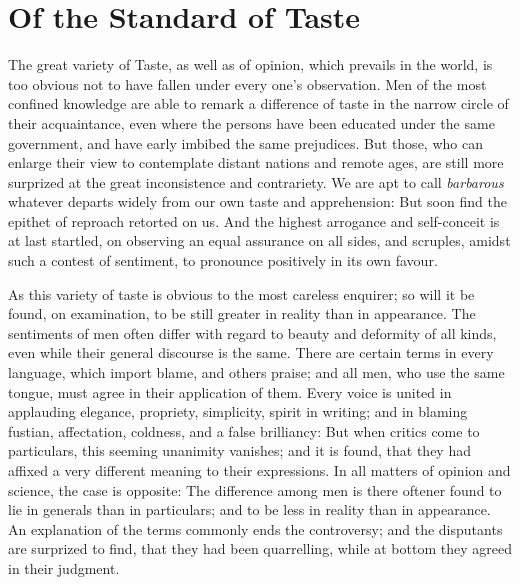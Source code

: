 
\author{David Hume}
\chapter{Of the Standard of Taste\footnotemark}

The great variety of Taste, as well as of opinion, which
prevails in the world, is too obvious not to have fallen under every
one's observation. Men of the most confined knowledge are able to
remark a difference of taste in the narrow circle of their
acquaintance, even where the persons have been educated under the same
government, and have early imbibed the same prejudices. But those, who
can enlarge their view to contemplate distant nations and remote ages,
are still more surprized at the great inconsistence and contrariety.
We are apt to call \textit{barbarous} whatever departs widely from our
own taste and apprehension: But soon find the epithet of reproach
retorted on us. And the highest arrogance and self-conceit is at last
startled, on observing an equal assurance on all sides, and scruples,
amidst such a contest of sentiment, to pronounce positively in its own
favour.

As this variety of taste is obvious to the most careless enquirer; so
will it be found, on examination, to be still greater in reality than
in appearance. The sentiments of men often differ with regard to
beauty and deformity of all kinds, even while their general discourse
is the same. There are certain terms in every language, which import
blame, and others praise; and all men, who use the same tongue, must
agree in their application of them. Every voice is united in
applauding elegance, propriety, simplicity, spirit in writing; and in
blaming fustian, affectation, coldness, and a false brilliancy: But
when critics come to particulars, this seeming unanimity vanishes; and
it is found, that they had affixed a very different meaning to their
expressions. In all matters of opinion and science, the case is
opposite: The difference among men is there oftener found to lie in
generals than in particulars; and to be less in reality than in
appearance. An explanation of the terms commonly ends the controversy;
and the disputants are surprized to find, that they had been
quarrelling, while at bottom they agreed in their judgment.

